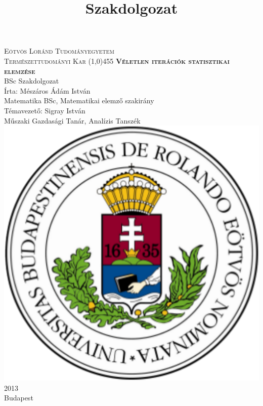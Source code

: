 \documentclass[a4paper,12pt]{report}
\title{Szakdolgozat}
\newcommand{\noun}[1]{\textsc{#1}}
\begin{document}
\begin{singlespace}


	\thispagestyle{empty}
	\begin{center}
		{\large \noun{Eötvös Loránd Tudományegyetem \\ Természettudományi Kar} }
		\line(1,0){455}
		\vspace{80pt}
		{\Huge \noun{\textbf{Véletlen iterációk statisztikai elemzése}}}
		\vspace{20pt}
		\\BSc Szakdolgozat
		\vspace{90pt}
		\\Írta: Mészáros Ádám István\\ Matematika BSc, Matematikai elemző szakirány\\
		\vspace{35pt}
		Témavezető: Sigray István\\ Műszaki Gazdasági Tanár, Analízis Tanszék\\
		\vspace{100pt}
		\includegraphics[scale=0.21]{kepek/elte.png}
		\vspace{25pt}
		\\ 2013\\ Budapest
	\end{center}
\end{singlespace}
	\tableofcontents
\end{document}

